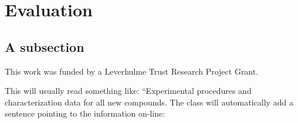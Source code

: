 \documentclass[journal=jacsat,manuscript=article]{achemso}
\begin{document}
\section{Evaluation}

\subsection{A subsection}

\begin{acknowledgement}

This work was funded by a Leverhulme Trust Research Project Grant.

\end{acknowledgement}

\begin{suppinfo}

This will usually read something like: ``Experimental procedures and
characterization data for all new compounds. The class will
automatically add a sentence pointing to the information on-line:

\end{suppinfo}


\end{document}
